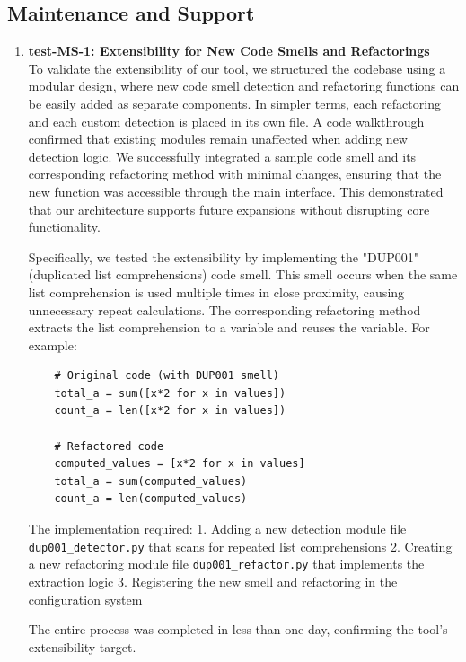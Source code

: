 \documentclass[12pt, titlepage]{article}
\begin{document}
\subsection{Maintenance and Support}
\begin{enumerate}

  \item \textbf{test-MS-1: Extensibility for New Code Smells and
    Refactorings} \\[2mm]
    To validate the extensibility of our tool, we structured the
    codebase using a modular design, where new code smell detection
    and refactoring functions can
    be easily added as separate components. In simpler terms, each
    refactoring and each custom detection is placed in its own file.
    A code walkthrough confirmed that
    existing modules remain unaffected when adding new detection
    logic. We successfully integrated a sample code smell and its
    corresponding refactoring method with
    minimal changes, ensuring that the new function was accessible
    through the main interface. This demonstrated that our
    architecture supports future expansions without
    disrupting core functionality.
    
    Specifically, we tested the extensibility by implementing the "DUP001" (duplicated list comprehensions) code smell. This smell occurs when the same list comprehension is used multiple times in close proximity, causing unnecessary repeat calculations. The corresponding refactoring method extracts the list comprehension to a variable and reuses the variable. For example:
    
    \begin{verbatim}
    # Original code (with DUP001 smell)
    total_a = sum([x*2 for x in values])
    count_a = len([x*2 for x in values])
    
    # Refactored code
    computed_values = [x*2 for x in values]
    total_a = sum(computed_values)
    count_a = len(computed_values)
    \end{verbatim}
    
    The implementation required:
    1. Adding a new detection module file \texttt{dup001\_detector.py} that scans for repeated list comprehensions
    2. Creating a new refactoring module file \texttt{dup001\_refactor.py} that implements the extraction logic
    3. Registering the new smell and refactoring in the configuration system
    
    The entire process was completed in less than one day, confirming the tool's extensibility target.


\end{enumerate}
\end{document}
